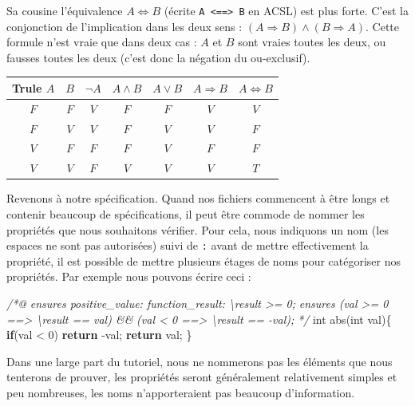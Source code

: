 \documentclass[12pt,francais,]{scrbook}
\newenvironment{Shaded}{}{}
\newcommand{\KeywordTok}[1]{\textcolor[rgb]{0.00,0.44,0.13}{\textbf{{#1}}}}
\newcommand{\DataTypeTok}[1]{\textcolor[rgb]{0.56,0.13,0.00}{{#1}}}
\newcommand{\DecValTok}[1]{\textcolor[rgb]{0.25,0.63,0.44}{{#1}}}
\newcommand{\CommentTok}[1]{\textcolor[rgb]{0.38,0.63,0.69}{\textit{{#1}}}}
\newcommand{\NormalTok}[1]{{#1}}
\newenvironment{zdsblock}[1]{%
  \tcolorbox[beamer,%
    noparskip,breakable,
    colback=LightBlue,colframe=DarkBlue,%
    colbacklower=DarkBlue,%
    title=#1]
}{\endtcolorbox}
\begin{document}
Sa cousine l'équivalence \(A \Leftrightarrow B\) (écrite
\texttt{A\ \textless{}==\textgreater{}\ B} en ACSL) est plus forte.
C'est la conjonction de l'implication dans les deux sens :
\((A \Rightarrow B) \wedge (B \Rightarrow A)\). Cette formule n'est
vraie que dans deux cas : \(A\) et \(B\) sont vraies toutes les deux, ou
fausses toutes les deux (c'est donc la négation du ou-exclusif).

\begin{zdsblock}{Information}
\begin{longtable}[]{@{}ccccccc@{}}
Trule
\(A\) & \(B\) & \(\neg A\) & \(A \wedge B\) & \(A \vee B\) & \(A \Rightarrow B\) & \(A \Leftrightarrow B\)\tabularnewline
\midrule
\endhead
\(F\) & \(F\) & \(V\) & \(F\) & \(F\) & \(V\) &\(V\)\tabularnewline
\(F\) & \(V\) & \(V\) & \(F\) & \(V\) & \(V\) &\(F\)\tabularnewline
\(V\) & \(F\) & \(F\) & \(F\) & \(V\) & \(F\) &\(F\)\tabularnewline
\(V\) & \(V\) & \(F\) & \(V\) & \(V\) & \(V\) &\(T\)\tabularnewline
\bottomrule
\end{longtable}
\end{zdsblock}

Revenons à notre spécification. Quand nos fichiers commencent à être
longs et contenir beaucoup de spécifications, il peut être commode de
nommer les propriétés que nous souhaitons vérifier. Pour cela, nous
indiquons un nom (les espaces ne sont pas autorisées) suivi de
\texttt{:} avant de mettre effectivement la propriété, il est possible
de mettre plusieurs \og{}étages\fg{} de noms pour catégoriser nos propriétés.
Par exemple nous pouvons écrire ceci :

\begin{footnotesize}\begin{Shaded}
\begin{Highlighting}[]
\CommentTok{/*@}
\CommentTok{  ensures positive_value: function_result: \textbackslash{}result >= 0;}
\CommentTok{  ensures (val >= 0 ==> \textbackslash{}result == val) && }
\CommentTok{          (val < 0 ==> \textbackslash{}result == -val);}
\CommentTok{*/}
\DataTypeTok{int} \NormalTok{abs(}\DataTypeTok{int} \NormalTok{val)\{}
  \KeywordTok{if}\NormalTok{(val < }\DecValTok{0}\NormalTok{) }\KeywordTok{return} \NormalTok{-val;}
  \KeywordTok{return} \NormalTok{val;}
\NormalTok{\}}
\end{Highlighting}
\end{Shaded}\end{footnotesize}

Dans une large part du tutoriel, nous ne nommerons pas les éléments que
nous tenterons de prouver, les propriétés seront généralement
relativement simples et peu nombreuses, les noms n'apporteraient pas
beaucoup d'information.
\end{document}
